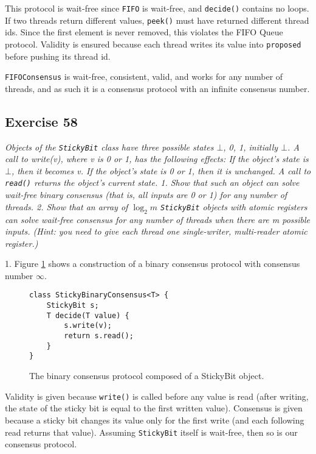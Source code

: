 \documentclass[a4paper,10pt]{article}
\begin{document}
This protocol is wait-free since \lstinline|FIFO| is wait-free, and \lstinline|decide()| contains no loops. If two threads return different values,
\lstinline|peek()| must have returned different thread ids. Since the first element is never removed, this violates the FIFO Queue protocol. Validity is ensured because each thread writes its value into \lstinline|proposed| before pushing its thread id.

\lstinline|FIFOConsensus| is wait-free, consistent, valid, and works for any number of threads, and as such it is a consensus protocol with an infinite consensus number.

\vspace{3mm}

\subsection{Exercise 58}

\emph{Objects of the \lstinline|StickyBit| class have three possible states $\bot$, 0, 1,
initially $\bot$. A call to write(v), where v is 0 or 1, has the following effects:
If the object’s state is $\bot$, then it becomes v.
If the object’s state is 0 or 1, then it is unchanged.
A call to \lstinline|read()| returns the object’s current state.
1. Show that such an object can solve wait-free binary consensus (that is, all
inputs are 0 or 1) for any number of threads.
2. Show that an array of $\log_2 m$ \lstinline|StickyBit| objects with atomic registers can
solve wait-free consensus for any number of threads when there are m possible inputs. (Hint: you need to give each thread one single-writer, multi-reader
atomic register.)}

\vspace{3mm}

1. Figure \ref{fig:binarystickyconsensus} shows a construction of a binary consensus protocol with consensus number $\infty$.

\begin{figure}
\begin{lstlisting}
class StickyBinaryConsensus<T> {
    StickyBit s;
    T decide(T value) {
        s.write(v);
        return s.read();
    }
}
\end{lstlisting}
\caption{The binary consensus protocol composed of a StickyBit object.}
\label{fig:binarystickyconsensus}
\end{figure}

Validity is given because \lstinline|write()| is called before any value is read (after writing, the state of the sticky bit is equal to the first written value). Consensus is given because a sticky bit changes its value only for the first write (and each following read returns that value). Assuming \lstinline|StickyBit| itself is wait-free, then so is our consensus protocol.
\end{document}
